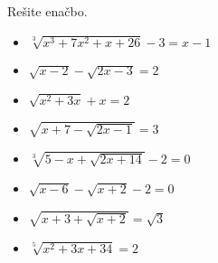         
            \begin{naloga}
                Rešite enačbo.
                \begin{multicols}{2}
                    \begin{itemize}
                        \item $\displaystyle \sqrt[3]{x^3+7x^2+x+26}-3=x-1$ 
                        \item $\displaystyle \sqrt{x-2}-\sqrt{2x-3}=2$ 
                        \item $\displaystyle \sqrt{x^2+3x}+x=2$ 
                        \item $\displaystyle \sqrt{x+7-\sqrt{2x-1}}=3$ 
                        \item $\displaystyle \sqrt[3]{5-x+\sqrt{2x+14}}-2=0$ 
                        \item $\displaystyle \sqrt{x-6}-\sqrt{x+2}-2=0$ 
                        \item $\displaystyle \sqrt{x+3+\sqrt{x+2}}=\sqrt{3}$ 
                        \item $\displaystyle \sqrt[5]{x^2+3x+34}=2$ 
                    \end{itemize}
                \end{multicols}
            \end{naloga}
        
